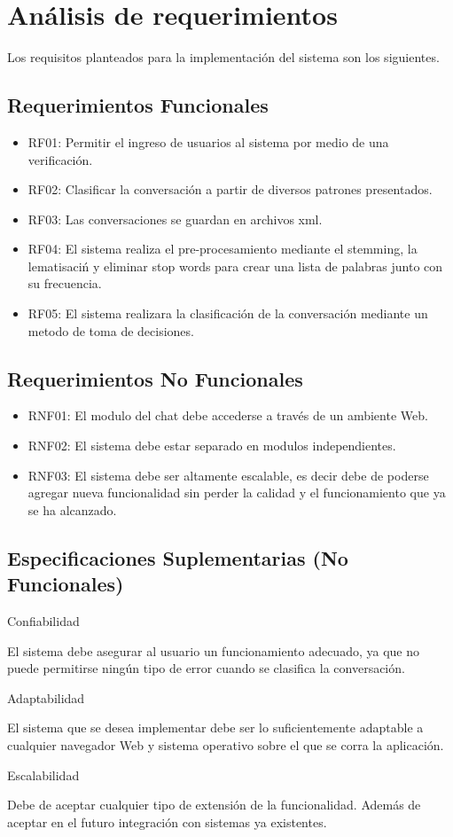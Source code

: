 \section{An\'alisis de requerimientos}
Los requisitos planteados para la implementaci\'on del sistema son los siguientes.

\subsection{Requerimientos Funcionales}

\begin{itemize}
\item{RF01:} Permitir el ingreso de usuarios al sistema por medio de una verificaci\'on. 
\item{RF02:} Clasificar la conversaci\'on a partir de diversos patrones presentados.
\item{RF03:} Las conversaciones se guardan en archivos xml.
\item{RF04:} El sistema realiza el pre-procesamiento mediante el stemming, la lematisaci\'n y eliminar  stop words para crear una lista de palabras junto con su frecuencia. 
\item{RF05:} El sistema realizara la clasificaci\'on de la conversaci\'on mediante un metodo de toma de decisiones.
\end{itemize}

\subsection{Requerimientos No Funcionales}

\begin{itemize}
\item{RNF01:} El modulo del chat debe accederse a trav\'es de un ambiente Web. 
\item{RNF02:} El sistema debe estar separado en modulos independientes.
\item{RNF03:} El sistema debe ser altamente escalable, es decir debe de poderse agregar nueva funcionalidad sin perder la calidad y el funcionamiento que ya se ha alcanzado.
\end{itemize}

\subsection{Especificaciones Suplementarias (No Funcionales)}
 
Confiabilidad
 
El sistema debe asegurar al usuario un funcionamiento adecuado, ya que no puede permitirse ning\'un tipo de error cuando se clasifica la conversaci\'on. 

Adaptabilidad 

El sistema que se desea implementar debe ser lo suficientemente adaptable a cualquier navegador Web y sistema operativo sobre el que se corra la aplicaci\'on. 

Escalabilidad 

Debe de aceptar cualquier tipo de extensi\'on de la funcionalidad. Adem\'as de aceptar en el futuro integraci\'on con sistemas ya existentes.